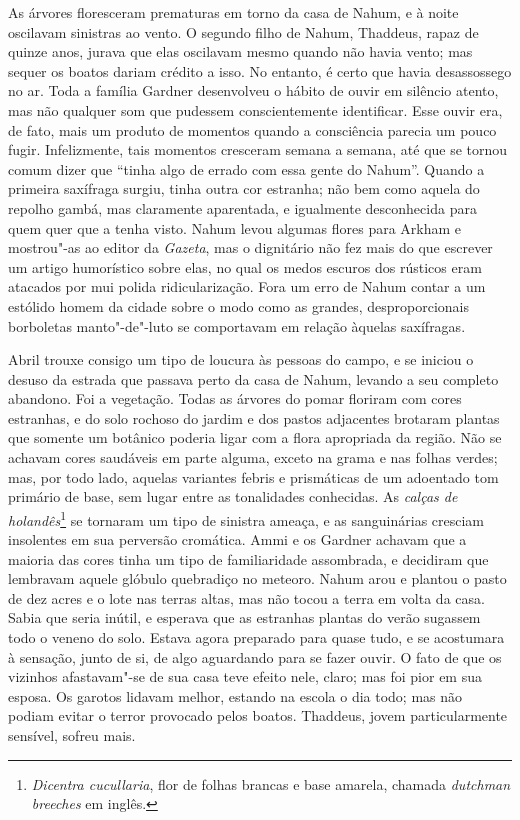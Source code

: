 As árvores floresceram prematuras em torno da casa de Nahum, e à noite
oscilavam sinistras ao vento. O segundo filho de Nahum, Thaddeus, rapaz
de quinze anos, jurava que elas oscilavam mesmo quando não havia vento;
mas sequer os boatos dariam crédito a isso. No entanto, é certo que
havia desassossego no ar. Toda a família Gardner desenvolveu o hábito de
ouvir em silêncio atento, mas não qualquer som que pudessem
conscientemente identificar. Esse ouvir era, de fato, mais um produto de
momentos quando a consciência parecia um pouco fugir. Infelizmente, tais
momentos cresceram semana a semana, até que se tornou comum dizer que
``tinha algo de errado com essa gente do Nahum''. Quando a primeira
saxífraga surgiu, tinha outra cor estranha; não bem como aquela do
repolho gambá, mas claramente aparentada, e igualmente desconhecida para
quem quer que a tenha visto. Nahum levou algumas flores para Arkham e
mostrou"-as ao editor da \textit{Gazeta}, mas o dignitário não fez mais do
que escrever um artigo humorístico sobre elas, no qual os medos escuros
dos rústicos eram atacados por mui polida ridicularização. Fora um erro
de Nahum contar a um estólido homem da cidade sobre o modo como as
grandes, desproporcionais borboletas manto"-de"-luto se comportavam em
relação àquelas saxífragas.

Abril trouxe consigo um tipo de loucura às pessoas do campo, e se
iniciou o desuso da estrada que passava perto da casa de Nahum, levando
a seu completo abandono. Foi a vegetação. Todas as árvores do pomar
floriram com cores estranhas, e do solo rochoso do jardim e dos pastos
adjacentes brotaram plantas que somente um botânico poderia ligar com a
flora apropriada da região. Não se achavam cores saudáveis em parte
alguma, exceto na grama e nas folhas verdes; mas, por todo lado, aquelas
variantes febris e prismáticas de um adoentado tom primário de base, sem
lugar entre as tonalidades conhecidas. As \textit{calças de
holandês}\footnote{\textit{Dicentra cucullaria}, flor de folhas brancas e
  base amarela, chamada \textit{dutchman breeches} em inglês.} se tornaram
um tipo de sinistra ameaça, e as sanguinárias cresciam insolentes em sua
perversão cromática. Ammi e os Gardner achavam que a maioria das cores
tinha um tipo de familiaridade assombrada, e decidiram que lembravam
aquele glóbulo quebradiço no meteoro. Nahum arou e plantou o pasto de
dez acres e o lote nas terras altas, mas não tocou a terra em volta da
casa. Sabia que seria inútil, e esperava que as estranhas plantas do
verão sugassem todo o veneno do solo. Estava agora preparado para quase
tudo, e se acostumara à sensação, junto de si, de algo aguardando para
se fazer ouvir. O fato de que os vizinhos afastavam"-se de sua casa teve
efeito nele, claro; mas foi pior em sua esposa. Os garotos lidavam
melhor, estando na escola o dia todo; mas não podiam evitar o terror
provocado pelos boatos. Thaddeus, jovem particularmente sensível, sofreu
mais.

